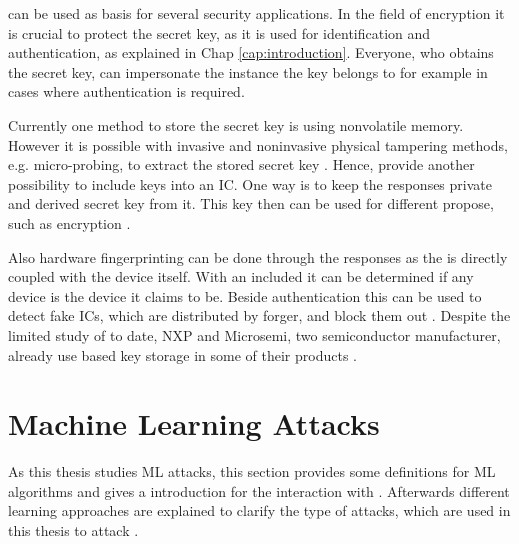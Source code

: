 \pufs can be used as basis for several security applications.
In the field of encryption it is crucial to protect the secret key, as it is used for identification and authentication, as explained in Chap \ref{cap:introduction}.
Everyone, who obtains the secret key, can impersonate the instance the key belongs to for example in cases where  authentication is required.

Currently one method to store the secret key is using nonvolatile memory.
However it is possible with invasive and noninvasive physical tampering methods, e.g. micro-probing, to extract the stored secret key \cite{Lim2005ExtractingCircuits}. %
Hence, \pufs provide another possibility to include keys into an \ac{IC}.
One way is to keep the \puf responses private and derived secret key from it.
This key then can be used for different propose, such as encryption \cite{Tajik2014PhysicalPUFs}.

Also hardware fingerprinting can be done through the \puf responses as the \puf is directly coupled with the device itself.
With an included \puf it can be determined if any device is the device it claims to be. %
Beside authentication this can be used to detect fake \acp{IC}, which are distributed by forger, and block them out \cite{Machida2015ImplementationFPGA}.
Despite the limited study of \pufs to date, \acl{NXP} and Microsemi, two semiconductor manufacturer, already use \puf based key storage in some of their products \cite{Becker2015ThePUFs}.



\section{Machine Learning Attacks}

As this thesis studies \acf{ML} attacks, this section provides some definitions for \ac{ML} algorithms and gives a introduction for the interaction with \pufs.
Afterwards different learning approaches are explained to clarify the type of attacks, which are used in this thesis to attack \pufs. %

